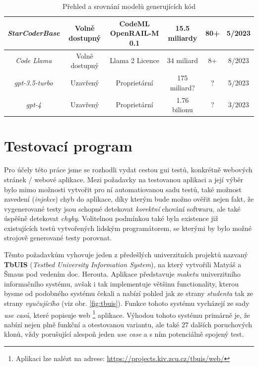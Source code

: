 \documentclass[czech, ma, kiv, he, iso690alph, pdf, viewonly]{fasthesis}
\begin{document}
\begin{landscape}
\begin{table}[H]
\begin{tabular}{|c|c|c|c|c|c|}
                    \hline
                    \textit{StarCoderBase} & Volně dostupný & CodeML OpenRAIL-M 0.1 & 15.5 miliardy & 80+ & 5/2023 \\
                    \hline
                    \textit{Code Llama} & Volně dostupný & Llama 2 Licence & 34 miliard & 8+ & 8/2023 \\
                    \hline
                    \textit{gpt-3.5-turbo} & Uzavřený & Proprietární & 175 miliard? & ? & 5/2023 \\
                    \hline
                    \textit{gpt-4} & Uzavřený & Proprietární & 1.76 bilionu & ? & 3/2023 \\
                    \hline
                \end{tabular}
                \centering
                \caption{Přehled a srovnání modelů generujících kód}
                \label{tab:code_models_comp}
            \end{table} 
        \end{landscape}
    
    \section{Testovací program} \label{sec:test_program}

    Pro účely této práce jsme se rozhodli vydat cestou \acrshort{gui} testů, konkrétně webových stránek / webové aplikace. Mezi požadavky na testovanou aplikaci a její výběr bylo mimo možnosti vytvořit pro ní automatiovanou sadu testů, také možnost zavedení (\emph{injekce}) chyb do aplikace, díky kterým bude možno ověřit nejen fakt, že vygenerované testy jsou schopné detekovat \textit{korektní} chování softwaru, ale také úspěšně detekovat \textit{chyby}. Volitelnou podmínkou také byla existence již existujících testů vytvořených lidským programátorem, se kterými by bylo možné strojově generované testy porovnat.
    
    Těmto požadavkům vyhovuje jeden z předešlých univerzitních projektů nazvaný \textbf{TbUIS} (\textit{Testbed University Information System}), na který vytvořili Matyáš a Šmaus pod vedením doc. Herouta. \cite{Matyas2018} \cite{Smaus2019} Aplikace představuje \textit{maketu} univerzitního informačního systému, avšak i tak implementuje většinu functionality, kterou bysme od podobného systému čekali a nabízí pohled jak ze strany \textit{studenta} tak ze strany \textit{vyučujícího} (viz obr. \ref{fig:tbuis}). Funkce tohoto systému vycházejí ze sady \textit{use casů}, které popisuje web \footnote{Aplikaci lze nalézt na adrese: \url{https://projects.kiv.zcu.cz/tbuis/web/}} aplikace. Výhodou tohoto systému primárně je, že nabízí nejen plně funkční a otestovanou variantu, ale také \(27\) dalších poruchových klonů, vždy porušující alespoň jeden \textit{use case} a s ním potenciálně spojený test.
\end{document}
